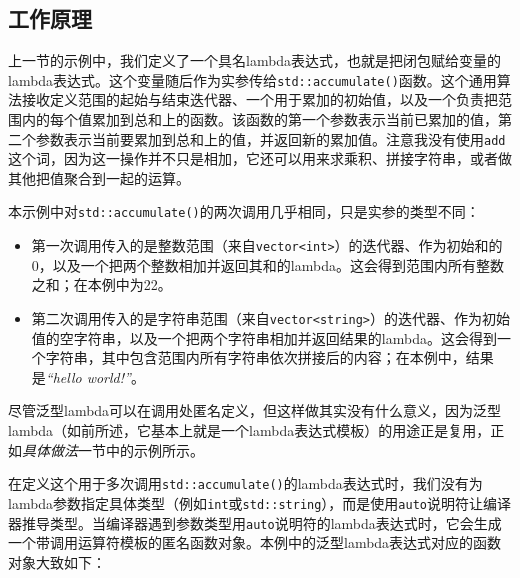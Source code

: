 
\subsection{工作原理}


上一节的示例中，我们定义了一个具名lambda表达式，也就是把闭包赋给变量的lambda表达式。这个变量随后作为实参传给\texttt{std::\allowbreak{}accumulate()}函数。这个通用算法接收定义范围的起始与结束迭代器、一个用于累加的初始值，以及一个负责把范围内的每个值累加到总和上的函数。该函数的第一个参数表示当前已累加的值，第二个参数表示当前要累加到总和上的值，并返回新的累加值。注意我没有使用\texttt{add}这个词，因为这一操作并不只是相加，它还可以用来求乘积、拼接字符串，或者做其他把值聚合到一起的运算。



本示例中对\texttt{std::\allowbreak{}accumulate()}的两次调用几乎相同，只是实参的类型不同：



\begin{itemize}
\item 第一次调用传入的是整数范围（来自\texttt{vector<\allowbreak{}int>}）的迭代器、作为初始和的0，以及一个把两个整数相加并返回其和的lambda。这会得到范围内所有整数之和；在本例中为22。



\item 第二次调用传入的是字符串范围（来自\texttt{vector<\allowbreak{}string>}）的迭代器、作为初始值的空字符串，以及一个把两个字符串相加并返回结果的lambda。这会得到一个字符串，其中包含范围内所有字符串依次拼接后的内容；在本例中，结果是\textit{“hello world!”}。

\end{itemize}



尽管泛型lambda可以在调用处匿名定义，但这样做其实没有什么意义，因为泛型lambda（如前所述，它基本上就是一个lambda表达式模板）的用途正是复用，正如\textit{具体做法}一节中的示例所示。



在定义这个用于多次调用\texttt{std::\allowbreak{}accumulate()}的lambda表达式时，我们没有为lambda参数指定具体类型（例如\texttt{int}或\texttt{std::\allowbreak{}string}），而是使用\texttt{auto}说明符让编译器推导类型。当编译器遇到参数类型用\texttt{auto}说明符的lambda表达式时，它会生成一个带调用运算符模板的匿名函数对象。本例中的泛型lambda表达式对应的函数对象大致如下：


